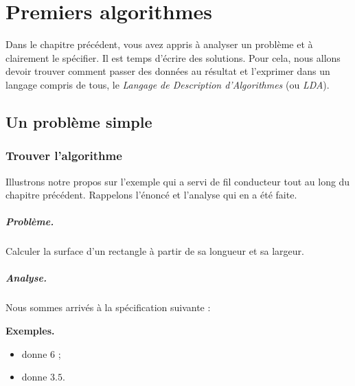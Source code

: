 \chapter{Premiers algorithmes}

	Dans le chapitre précédent,
	vous avez appris à analyser un problème
	et à clairement le spécifier.
	Il est temps d'écrire des solutions.
	Pour cela, nous allons devoir trouver
	comment passer des données au résultat
	et l'exprimer dans un langage compris de tous, 
	le \emph{Langage de Description d'Algorithmes} 
	(ou \emph{LDA}).
	
	\section{Un problème simple}
	
		\subsection{Trouver l'algorithme}

			Illustrons notre propos sur l'exemple 
			qui a servi de fil conducteur
			tout au long du chapitre précédent.
			Rappelons l'énoncé et l'analyse qui en a été faite.
			
			\begin{Emphase}
				\paragraph{Problème.}
				Calculer la surface d'un rectangle 
				à partir de sa longueur et sa largeur.
			
				\paragraph{Analyse.} 
				Nous sommes arrivés à la spécification suivante :
				\begin{center}
				\end{center}
				
				\textbf{Exemples.} 
				\begin{multicols}{2}
					\begin{itemize}
					\item {} donne $6$ ;
					\item {} donne $3.5$.		
					\end{itemize}
				\end{multicols}
			\end{Emphase}
			
